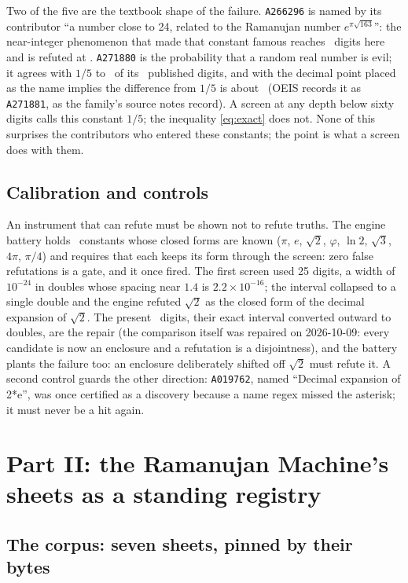 \documentclass[11pt]{article}
\theoremstyle{definition}
\theoremstyle{plain}
\begin{document}
Two of the five are the textbook shape of the failure. \texttt{A266296} is named by its contributor ``a number close to 24, related to the Ramanujan number $e^{\pi\sqrt{163}}$'': the near-integer phenomenon that made that constant famous reaches \RamDepth\ digits here and is refuted at \RamPublished. \texttt{A271880} is the probability that a random real number is evil; it agrees with $1/5$ to \EvilDepth\ of its \EvilPublished\ published digits, and with the decimal point placed as the name implies the difference from $1/5$ is about \EvilGapProb\ (OEIS records it as \texttt{A271881}, as the family's source notes record). A screen at any depth below sixty digits calls this constant $1/5$; the inequality \eqref{eq:exact} does not. None of this surprises the contributors who entered these constants; the point is what a screen does with them.


\subsection{Calibration and controls}\label{sec:calib}

An instrument that can refute must be shown not to refute truths. The engine battery \cite{repo} holds \CalibCount\ constants whose closed forms are known ($\pi$, $e$, $\sqrt2$, $\varphi$, $\ln2$, $\sqrt3$, $4\pi$, $\pi/4$) and requires that each keeps its form through the screen: zero false refutations is a gate, and it once fired. The first screen used 25 digits, a width of $10^{-24}$ in doubles whose spacing near $1.4$ is $2.2\times10^{-16}$; the interval collapsed to a single double and the engine refuted $\sqrt2$ as the closed form of the decimal expansion of $\sqrt2$. The present \ScreenDigits\ digits, their exact interval converted outward to doubles, are the repair (the comparison itself was repaired on 2026-10-09: every candidate is now an enclosure and a refutation is a disjointness), and the battery plants the failure too: an enclosure deliberately shifted off $\sqrt2$ must refute it. A second control guards the other direction: \texttt{A019762}, named ``Decimal expansion of 2*e'', was once certified as a discovery because a name regex missed the asterisk; it must never be a hit again.

\section{Part II: the Ramanujan Machine's sheets as a standing registry}

\subsection{The corpus: seven sheets, pinned by their bytes}\label{sec:sheets}
\end{document}
